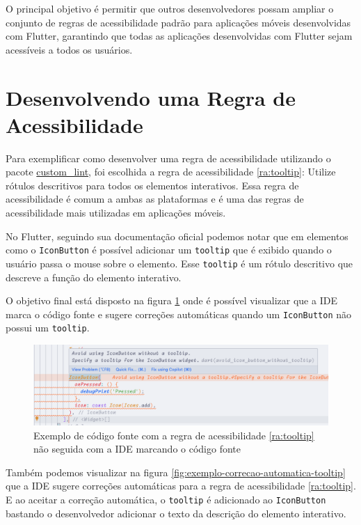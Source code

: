 O principal objetivo é permitir que outros desenvolvedores possam ampliar o conjunto de regras de acessibilidade padrão para aplicações móveis desenvolvidas com Flutter, garantindo que todas as aplicações desenvolvidas com Flutter sejam acessíveis a todos os usuários.

\section{Desenvolvendo uma Regra de Acessibilidade}

Para exemplificar como desenvolver uma regra de acessibilidade utilizando o pacote \href{https://pub.dev/packages/custom_lint}{custom\_lint}, foi escolhida a regra de acessibilidade \ref{ra:tooltip}: Utilize rótulos descritivos para todos os elementos interativos. Essa regra de acessibilidade é comum a ambas as plataformas e é uma das regras de acessibilidade mais utilizadas em aplicações móveis.

No Flutter, seguindo sua documentação oficial \cite{flutter} podemos notar que em elementos como o \texttt{IconButton} é possível adicionar um \texttt{tooltip} que é exibido quando o usuário passa o mouse sobre o elemento. Esse \texttt{tooltip} é um rótulo descritivo que descreve a função do elemento interativo.

O objetivo final está disposto na figura \ref{fig:exemplo-codigo-fonte-tooltip} onde é possível visualizar que a IDE marca o código fonte e sugere correções automáticas quando um \texttt{IconButton} não possui um \texttt{tooltip}.

\begin{figure}[!ht]
	\centering
	\caption{Exemplo de código fonte com a regra de acessibilidade \ref{ra:tooltip} não seguida com a IDE marcando o código fonte}\label{fig:exemplo-codigo-fonte-tooltip}
	\includegraphics[width=425pt]{Assets/PrintIDEAviso.png}
\end{figure}

Também podemos visualizar na figura \ref{fig:exemplo-correcao-automatica-tooltip} que a IDE sugere correções automáticas para a regra de acessibilidade \ref{ra:tooltip}. E ao aceitar a correção automática, o \texttt{tooltip} é adicionado ao \texttt{IconButton} bastando o desenvolvedor adicionar o texto da descrição do elemento interativo.

